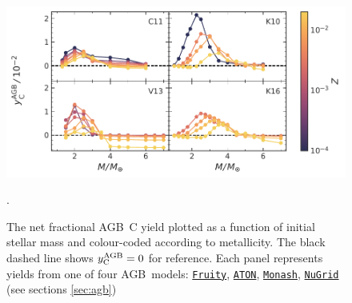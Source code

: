 \documentclass[fleqn,
referee, %
usenatbib]{mnras}
\newcommand{\fruity}{\texttt{\hyperlink{fruity}{Fruity}}}
\newcommand{\nugrid}{\texttt{\hyperlink{nugrid}{NuGrid}}}
\newcommand{\monash}{\texttt{\hyperlink{monash}{Monash}}}
\newcommand{\aton}{\texttt{\hyperlink{aton}{ATON}}}
\newcommand{\agb}{AGB}
\newcommand{\Ycagb}{{y_{\rm C}^{\rm AGB}}}
\begin{document}
\begin{figure}
    \centering
 	    \includegraphics[scale=1]{agb_yields.pdf}
        \caption[]{The net fractional \agb\ C yield  plotted as a function of initial stellar mass and colour-coded according to metallicity. The black dashed line shows $\Ycagb=0$ for reference. Each panel represents yields from one of four \agb\ models: \fruity{}, \aton{}, \monash{}, \nugrid{} (see sections \ref{sec:agb}) }.

        \label{fig:y_agb}
\end{figure}
\end{document}

